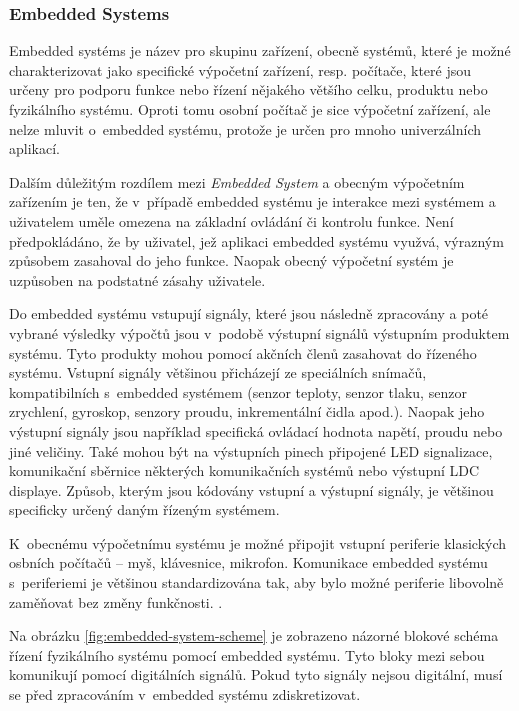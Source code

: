 \documentclass[a4paper, twoside, 11pt]{article}
\begin{document}
	\subsubsection{Embedded Systems}
	Embedded systéms je název pro skupinu zařízení, obecně systémů, které je možné charakterizovat jako specifické výpočetní zařízení, resp. počítače, které jsou určeny pro podporu funkce nebo řízení nějakého většího celku, produktu nebo fyzikálního systému. Oproti tomu osobní počítač je sice výpočetní zařízení, ale nelze mluvit o~embedded systému, protože je určen pro mnoho univerzálních aplikací. \cite{Sass2010}\par
	Dalším důležitým rozdílem mezi \textit{Embedded System} a obecným výpočetním zařízením je ten, že v~případě embedded systému je interakce mezi systémem a uživatelem uměle omezena na základní ovládání či kontrolu funkce. Není předpokládáno, že by uživatel, jež aplikaci embedded systému využvá, výrazným způsobem zasahoval do jeho funkce. Naopak obecný výpočetní systém je uzpůsoben na podstatné zásahy uživatele. \cite{Sass2010} \cite{juan-fpgas}\par
	Do embedded systému vstupují signály, které jsou následně zpracovány a poté vybrané výsledky výpočtů jsou v~podobě výstupní signálů výstupním produktem systému. Tyto produkty mohou pomocí akčních členů zasahovat do řízeného systému. Vstupní signály většinou přicházejí ze speciálních snímačů, kompatibilních s~embedded systémem (senzor teploty, senzor tlaku, senzor zrychlení, gyroskop, senzory proudu, inkrementální čidla apod.). Naopak jeho výstupní signály jsou například specifická ovládací hodnota napětí, proudu nebo jiné veličiny. Také mohou být na výstupních pinech připojené LED signalizace, komunikační sběrnice některých komunikačních systémů nebo výstupní LDC displaye. Způsob, kterým jsou kódovány vstupní a výstupní signály, je většinou specificky určený daným řízeným systémem. \cite{Sass2010}\par
	K~obecnému výpočetnímu systému je možné připojit vstupní periferie klasických osbních počítačů – myš, klávesnice, mikrofon. Komunikace embedded systému s~periferiemi je většinou standardizována tak, aby bylo možné periferie libovolně zaměňovat bez změny funkčnosti. \cite{Sass2010}.\par
	Na obrázku \ref{fig:embedded-system-scheme} je zobrazeno názorné blokové schéma řízení fyzikálního systému pomocí embedded systému. Tyto bloky mezi sebou komunikují pomocí digitálních signálů. Pokud tyto signály nejsou digitální, musí se před zpracováním v~embedded systému zdiskretizovat.
\end{document}
